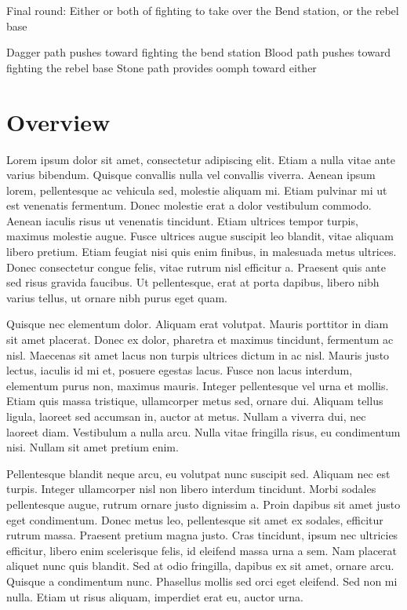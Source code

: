 \documentclass{novanarrative}
\begin{document}
Final round: Either or both of fighting to take over the Bend station,
or the rebel base

Dagger path pushes toward fighting the bend station
Blood path pushes toward fighting the rebel base
Stone path provides oomph toward either

\section{Overview}

Lorem ipsum dolor sit amet, consectetur adipiscing elit. Etiam a nulla vitae ante varius bibendum. Quisque convallis nulla vel convallis viverra. Aenean ipsum lorem, pellentesque ac vehicula sed, molestie aliquam mi. Etiam pulvinar mi ut est venenatis fermentum. Donec molestie erat a dolor vestibulum commodo. Aenean iaculis risus ut venenatis tincidunt. Etiam ultrices tempor turpis, maximus molestie augue. Fusce ultrices augue suscipit leo blandit, vitae aliquam libero pretium. Etiam feugiat nisi quis enim finibus, in malesuada metus ultrices. Donec consectetur congue felis, vitae rutrum nisl efficitur a. Praesent quis ante sed risus gravida faucibus. Ut pellentesque, erat at porta dapibus, libero nibh varius tellus, ut ornare nibh purus eget quam.

Quisque nec elementum dolor. Aliquam erat volutpat. Mauris porttitor in diam sit amet placerat. Donec ex dolor, pharetra et maximus tincidunt, fermentum ac nisl. Maecenas sit amet lacus non turpis ultrices dictum in ac nisl. Mauris justo lectus, iaculis id mi et, posuere egestas lacus. Fusce non lacus interdum, elementum purus non, maximus mauris. Integer pellentesque vel urna et mollis. Etiam quis massa tristique, ullamcorper metus sed, ornare dui. Aliquam tellus ligula, laoreet sed accumsan in, auctor at metus. Nullam a viverra dui, nec laoreet diam. Vestibulum a nulla arcu. Nulla vitae fringilla risus, eu condimentum nisi. Nullam sit amet pretium enim.

Pellentesque blandit neque arcu, eu volutpat nunc suscipit sed. Aliquam nec est turpis. Integer ullamcorper nisl non libero interdum tincidunt. Morbi sodales pellentesque augue, rutrum ornare justo dignissim a. Proin dapibus sit amet justo eget condimentum. Donec metus leo, pellentesque sit amet ex sodales, efficitur rutrum massa. Praesent pretium magna justo. Cras tincidunt, ipsum nec ultricies efficitur, libero enim scelerisque felis, id eleifend massa urna a sem. Nam placerat aliquet nunc quis blandit. Sed at odio fringilla, dapibus ex sit amet, ornare arcu. Quisque a condimentum nunc. Phasellus mollis sed orci eget eleifend. Sed non mi nulla. Etiam ut risus aliquam, imperdiet erat eu, auctor urna.
\end{document}
